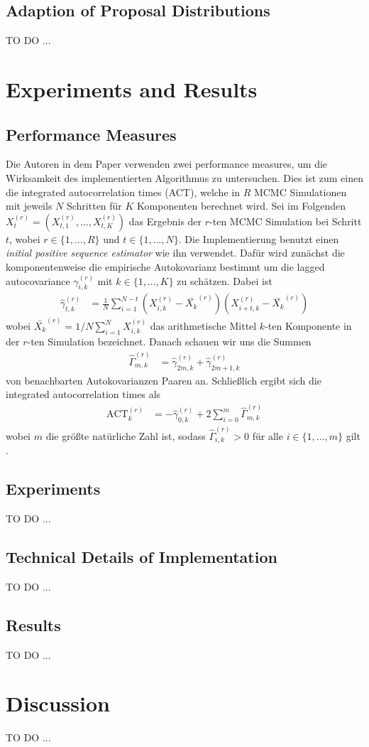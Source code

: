 \documentclass{scrartcl}
\begin{document}
    \subsection{Adaption of Proposal Distributions}
    TO DO ...


    \section{Experiments and Results}

    \subsection{Performance Measures}
    Die Autoren in dem Paper \cite{lau2019} verwenden zwei performance measures, um die Wirksamkeit des implementierten
    Algorithmus zu untersuchen. Dies ist zum einen die integrated autocorrelation times (ACT), welche in $R$ MCMC
    Simulationen mit jeweils $N$ Schritten für $K$ Komponenten berechnet wird. Sei im Folgenden
    $X_t^{(r)}=(X_{t,1}^{(r)},\dots,X_{t,K}^{(r)})$ das Ergebnis der $r$-ten MCMC Simulation bei Schritt $t$, wobei
    $r\in\{1,\dots,R\}$ und $t\in\{1,\dots,N\}$. Die Implementierung benutzt einen \textit{initial positive sequence estimator}
    wie ihn \cite{geyer1992} verwendet. Dafür wird zunächst die komponentenweise die empirische Autokovarianz bestimmt um
    die lagged autocovariance $\gamma_{i,k}^{(r)}$ mit $k\in\{1,\dots,K\}$ zu schätzen. Dabei ist
    \begin{align*}
        \hat{\gamma}_{t,k}^{(r)}&=\frac{1}{N}\sum\limits_{i=1}^{N-t}(X_{i,k}^{(r)}-\bar{X_k}^{(r)})(X_{i+t,k}^{(r)}-\bar{X_k}^{(r)})
    \end{align*}
    wobei $\bar{X_k}^{(r)}=1/N\sum\nolimits_{i=1}^NX_{i,k}^{(r)}$ das arithmetische Mittel $k$-ten Komponente in der $r$-ten
    Simulation bezeichnet. Danach schauen wir uns die Summen
    \begin{align*}
        \hat{\Gamma}_{m,k}^{(r)} &= \hat{\gamma}_{2m,k}^{(r)} + \hat{\gamma}_{2m+1,k}^{(r)}
    \end{align*}
    von benachbarten Autokovarianzen Paaren an. Schließlich ergibt sich die integrated autocorrelation times als
    \begin{align*}
        \text{ACT}_k^{(r)}&=-\hat{\gamma}_{0,k}^{(r)}+2\sum\limits_{i=0}^{m}\hat{\Gamma}_{m,k}^{(r)}
    \end{align*}
    wobei $m$ die größte natürliche Zahl ist, sodass $\hat{\Gamma}_{i,k}^{(r)} > 0$ für alle $i\in\{1,\dots,m\}$ gilt
    \cite{geyer1992}.

    \subsection{Experiments}
    TO DO ...

    \subsection{Technical Details of Implementation}
    TO DO ...

    \subsection{Results}
    TO DO ...


    \section{Discussion}
    TO DO ...

    
    
\end{document}

